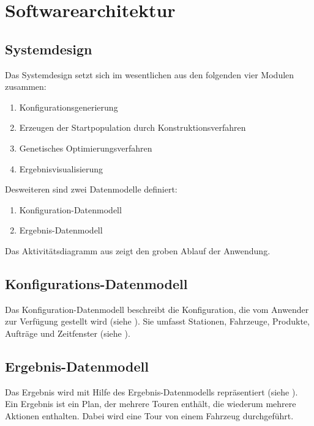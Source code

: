 \section{Softwarearchitektur}

\subsection{Systemdesign}
Das Systemdesign setzt sich im wesentlichen aus den folgenden vier Modulen zusammen:
\begin{enumerate}
 \item Konfigurationsgenerierung
 \item Erzeugen der Startpopulation durch Konstruktionsverfahren
 \item Genetisches Optimierungsverfahren
 \item Ergebnisvisualisierung
\end{enumerate}
Desweiteren sind zwei Datenmodelle definiert:
\begin{enumerate}
 \item Konfiguration-Datenmodell
 \item Ergebnis-Datenmodell
\end{enumerate}
Das Aktivitätsdiagramm aus  zeigt den groben Ablauf der Anwendung.


\subsection{Konfigurations-Datenmodell}
Das Konfiguration-Datenmodell beschreibt die Konfiguration, die vom Anwender zur Verfügung gestellt wird (siehe ). Sie umfasst Stationen, Fahrzeuge, Produkte, Aufträge und Zeitfenster (siehe ).

\subsection{Ergebnis-Datenmodell}
Das Ergebnis wird mit Hilfe des Ergebnis-Datenmodells repräsentiert (siehe ). Ein Ergebnis ist ein Plan, der mehrere Touren enthält, die wiederum mehrere Aktionen enthalten. Dabei wird eine Tour von einem Fahrzeug durchgeführt.

